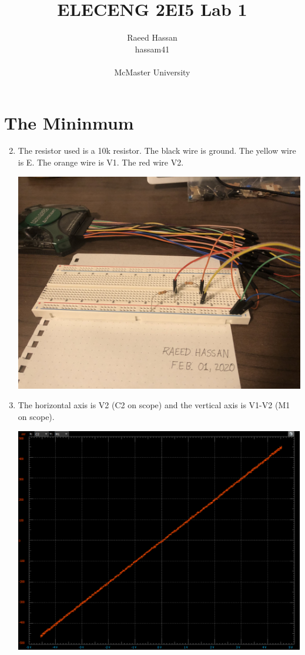 \documentclass[12pt]{article}
\title{ELECENG 2EI5 Lab 1}
\author{Raeed Hassan \\ hassam41 \\  \\ McMaster University}
\begin{document}
\maketitle
\pagebreak
\section{The Mininmum}
\begin{enumerate}
    \setcounter{enumi}{1}
    \item The resistor used is a 10k resistor. The black wire is ground. The yellow wire is E. The orange wire is V1. The red wire V2.
    \begin{center}
        \includegraphics[width=0.82\linewidth]{images/A2.png}
    \end{center}

    \setcounter{enumi}{3}
    \item The horizontal axis is V2 (C2 on scope) and the vertical axis is V1-V2 (M1 on scope).
    \begin{center}
        \includegraphics[width=0.82\linewidth]{images/A4.png}
    \end{center}


\end{enumerate}
\end{document}
